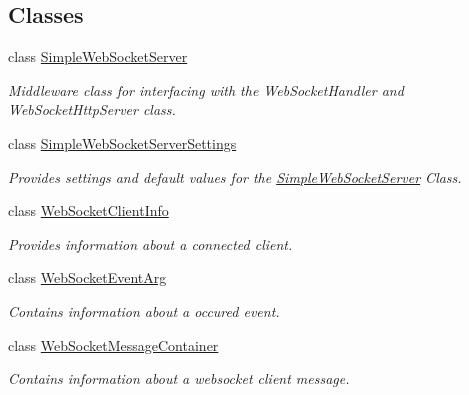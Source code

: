 \subsection*{Classes}
\begin{DoxyCompactItemize}
\item 
class \mbox{\hyperlink{class_simple_web_socket_server_library_1_1_simple_web_socket_server}{Simple\+Web\+Socket\+Server}}
\begin{DoxyCompactList}\small\item\em Middleware class for interfacing with the Web\+Socket\+Handler and Web\+Socket\+Http\+Server class. \end{DoxyCompactList}\item 
class \mbox{\hyperlink{class_simple_web_socket_server_library_1_1_simple_web_socket_server_settings}{Simple\+Web\+Socket\+Server\+Settings}}
\begin{DoxyCompactList}\small\item\em Provides settings and default values for the \mbox{\hyperlink{class_simple_web_socket_server_library_1_1_simple_web_socket_server}{Simple\+Web\+Socket\+Server}} Class. \end{DoxyCompactList}\item 
class \mbox{\hyperlink{class_simple_web_socket_server_library_1_1_web_socket_client_info}{Web\+Socket\+Client\+Info}}
\begin{DoxyCompactList}\small\item\em Provides information about a connected client. \end{DoxyCompactList}\item 
class \mbox{\hyperlink{class_simple_web_socket_server_library_1_1_web_socket_event_arg}{Web\+Socket\+Event\+Arg}}
\begin{DoxyCompactList}\small\item\em Contains information about a occured event. \end{DoxyCompactList}\item 
class \mbox{\hyperlink{class_simple_web_socket_server_library_1_1_web_socket_message_container}{Web\+Socket\+Message\+Container}}
\begin{DoxyCompactList}\small\item\em Contains information about a websocket client message. \end{DoxyCompactList}\end{DoxyCompactItemize}
